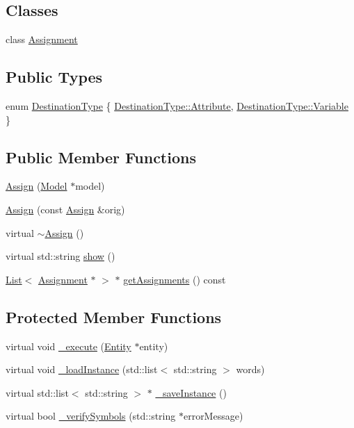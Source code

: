\subsection*{Classes}
\begin{DoxyCompactItemize}
\item 
class \hyperlink{class_assign_1_1_assignment}{Assignment}
\end{DoxyCompactItemize}
\subsection*{Public Types}
\begin{DoxyCompactItemize}
\item 
enum \hyperlink{class_assign_ae0f42117c12a8d0bc2bf0b7574070694}{Destination\+Type} \{ \hyperlink{class_assign_ae0f42117c12a8d0bc2bf0b7574070694af2bbdf9f72c085adc4d0404e370f0f4c}{Destination\+Type\+::\+Attribute}, 
\hyperlink{class_assign_ae0f42117c12a8d0bc2bf0b7574070694a47c14840d8e15331fa420b9b2f757cd9}{Destination\+Type\+::\+Variable}
 \}
\end{DoxyCompactItemize}
\subsection*{Public Member Functions}
\begin{DoxyCompactItemize}
\item 
\hyperlink{class_assign_afaa746a0ce157d4606823ad508dc6281}{Assign} (\hyperlink{class_model}{Model} $\ast$model)
\item 
\hyperlink{class_assign_ae4945adcf1b5dcdd3f57faa9dd85a2b0}{Assign} (const \hyperlink{class_assign}{Assign} \&orig)
\item 
virtual \hyperlink{class_assign_aa005626af06022d9101c5e38e794dc47}{$\sim$\+Assign} ()
\item 
virtual std\+::string \hyperlink{class_assign_af5022b92204adcd9ee3e444b7e316d07}{show} ()
\item 
\hyperlink{class_list}{List}$<$ \hyperlink{class_assign_1_1_assignment}{Assignment} $\ast$ $>$ $\ast$ \hyperlink{class_assign_aca4aaa2185cc8770e56e1b6928c33dc0}{get\+Assignments} () const 
\end{DoxyCompactItemize}
\subsection*{Protected Member Functions}
\begin{DoxyCompactItemize}
\item 
virtual void \hyperlink{class_assign_a5fabf69268b2e65d8b01ce247be87a40}{\+\_\+execute} (\hyperlink{class_entity}{Entity} $\ast$entity)
\item 
virtual void \hyperlink{class_assign_a95e3169a6ae13ef3dc6dd9f0dde16c30}{\+\_\+load\+Instance} (std\+::list$<$ std\+::string $>$ words)
\item 
virtual std\+::list$<$ std\+::string $>$ $\ast$ \hyperlink{class_assign_a8b38a0a1bec283f5d2f44f67be5a4a6b}{\+\_\+save\+Instance} ()
\item 
virtual bool \hyperlink{class_assign_a5f3a7d8a7214574fea926cae1b1acb94}{\+\_\+verify\+Symbols} (std\+::string $\ast$error\+Message)
\end{DoxyCompactItemize}
